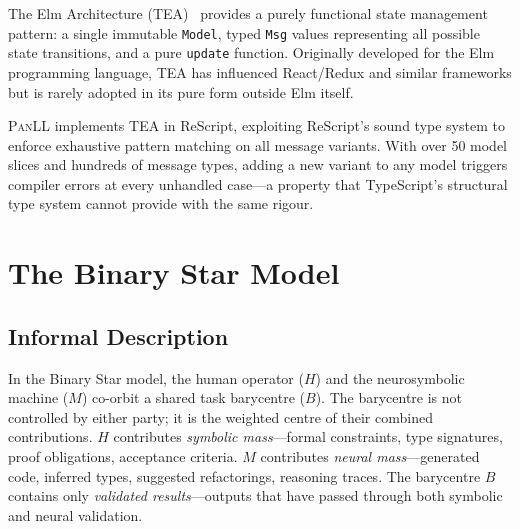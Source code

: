\documentclass[11pt,a4paper]{article}
\newcommand{\panll}{\textsc{PanLL}}
\newcommand{\tea}{\textsc{TEA}}
\begin{document}
The Elm Architecture (\tea{})~\citep{czaplicki2012elm} provides a
purely functional state management pattern: a single immutable
\texttt{Model}, typed \texttt{Msg} values representing all possible
state transitions, and a pure \texttt{update} function. Originally
developed for the Elm programming language, \tea{} has influenced
React/Redux and similar frameworks but is rarely adopted in its
pure form outside Elm itself.

\panll{} implements \tea{} in ReScript, exploiting ReScript's sound
type system to enforce exhaustive pattern matching on all message
variants. With over 50 model slices and hundreds of message types,
adding a new variant to any model triggers compiler errors at every
unhandled case---a property that TypeScript's structural type system
cannot provide with the same rigour.

\section{The Binary Star Model}\label{sec:binary-star}

\subsection{Informal Description}

In the Binary Star model, the human operator ($H$) and the
neurosymbolic machine ($M$) co-orbit a shared task barycentre ($B$).
The barycentre is not controlled by either party; it is the
weighted centre of their combined contributions. $H$ contributes
\textit{symbolic mass}---formal constraints, type signatures, proof
obligations, acceptance criteria. $M$ contributes \textit{neural
mass}---generated code, inferred types, suggested refactorings,
reasoning traces. The barycentre $B$ contains only \textit{validated
results}---outputs that have passed through both symbolic and neural
validation.
\end{document}
